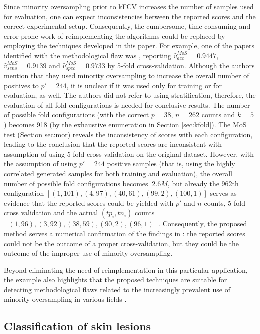 \documentclass[5p, final]{elsarticle}
\begin{document}
Since minority oversampling prior to kFCV increases the number of samples used for evaluation, one can expect inconsistencies between the reported scores and the correct experimental setup. Consequently, the cumbersome, time-consuming and error-prone work of reimplementing the algorithms could be replaced by employing the techniques developed in this paper. For example, one of the papers identified with the methodological flaw was \cite{ehgflaw2}, reporting $\hat{v}_{acc}^{MoS} = 0.9447$, $\hat{v}_{sens}^{MoS} = 0.9139$ and $\hat{v}_{spec}^{MoS} = 0.9733$ by 5-fold cross-validation. Although the authors mention that they used minority oversampling to increase the overall number of positives to $p'=244$, it is unclear if it was used only for training or for evaluation, as well.
The authors did not refer to using stratification, therefore, the evaluation of all fold configurations is needed for conclusive results. The number of possible fold configurations (with the correct $p=38$, $n=262$ counts and $k=5$) becomes 918 (by the exhaustive enumeration in Section \ref{sec:kfold}). The MoS test (Section {sec:mor}) reveals the inconsistency of scores with each configuration, leading to the conclusion that the reported scores are inconsistent with assumption of using 5-fold cross-validation on the original dataset. However, with the assumption of using $p'=244$ positive samples (that is, using the highly correlated generated samples for both training and evaluation), the overall number of possible fold configurations becomes $~2.6M$, but already the 962th configuration $[(1, 101), (4, 97), (40, 61), (99, 2), (100, 1)]$ serves as evidence that the reported scores could be yielded with $p'$ and $n$ counts, 5-fold cross validation and the actual $(tp_i, tn_i)$ counts $[(1, 96), (3, 92), (38, 59), (90, 2), (96, 1)]$. Consequently, the proposed method serves a numerical confirmation of the findings in \cite{ehg}: the reported scores could not be the outcome of a proper cross-validation, but they could be the outcome of the improper use of minority oversampling.

Beyond eliminating the need of reimplementation in this particular application, the example also highlights that the proposed techniques are suitable for detecting methodological flaws related to the increasingly prevalent use of minority oversampling in various fields \cite{smote}.

\subsection{Classification of skin lesions}
\label{sec:third}
\end{document}
